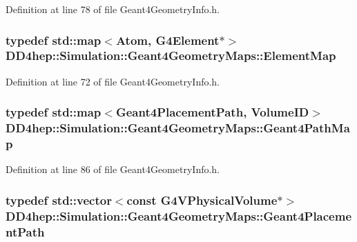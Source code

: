 Definition at line 78 of file Geant4GeometryInfo.h.\hypertarget{namespace_d_d4hep_1_1_simulation_1_1_geant4_geometry_maps_a175b532b796e7de3d9128c1f0e1ee406}{
\subsubsection[{ElementMap}]{\setlength{\rightskip}{0pt plus 5cm}typedef std::map$<$Atom, G4Element$\ast$$>$ {\bf DD4hep::Simulation::Geant4GeometryMaps::ElementMap}}}
\label{namespace_d_d4hep_1_1_simulation_1_1_geant4_geometry_maps_a175b532b796e7de3d9128c1f0e1ee406}


Definition at line 72 of file Geant4GeometryInfo.h.\hypertarget{namespace_d_d4hep_1_1_simulation_1_1_geant4_geometry_maps_a3d68bbc4e8d7a581a15f66d773dac6e7}{
\subsubsection[{Geant4PathMap}]{\setlength{\rightskip}{0pt plus 5cm}typedef std::map$<${\bf Geant4PlacementPath}, VolumeID$>$ {\bf DD4hep::Simulation::Geant4GeometryMaps::Geant4PathMap}}}
\label{namespace_d_d4hep_1_1_simulation_1_1_geant4_geometry_maps_a3d68bbc4e8d7a581a15f66d773dac6e7}


Definition at line 86 of file Geant4GeometryInfo.h.\hypertarget{namespace_d_d4hep_1_1_simulation_1_1_geant4_geometry_maps_a8a325934adb143cb1cbc47dd030395ed}{
\subsubsection[{Geant4PlacementPath}]{\setlength{\rightskip}{0pt plus 5cm}typedef std::vector$<$const G4VPhysicalVolume$\ast$$>$ {\bf DD4hep::Simulation::Geant4GeometryMaps::Geant4PlacementPath}}}
\label{namespace_d_d4hep_1_1_simulation_1_1_geant4_geometry_maps_a8a325934adb143cb1cbc47dd030395ed}


